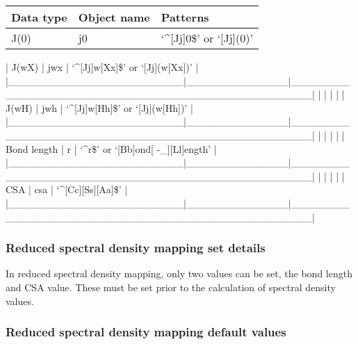 \begin{center}
\begin{tabular}{lll}
\toprule
Data type & Object name & Patterns \\
\midrule
 J(0)                    &  j0            &  `\^{}[Jj]0\$' or `[Jj](0)'                            \\
\bottomrule
\end{tabular}
\end{center}

| J(wX)                  | jwx          | `\^{}[Jj]w[Xx]\$' or `[Jj](w[Xx])'                   |
|\_\_\_\_\_\_\_\_\_\_\_\_\_\_\_\_\_\_\_\_\_\_\_\_|\_\_\_\_\_\_\_\_\_\_\_\_\_\_|\_\_\_\_\_\_\_\_\_\_\_\_\_\_\_\_\_\_\_\_\_\_\_\_\_\_\_\_\_\_\_\_\_\_\_\_\_\_\_\_\_\_\_\_\_\_\_\_\_\_|
|                        |              |                                                  |
| J(wH)                  | jwh          | `\^{}[Jj]w[Hh]\$' or `[Jj](w[Hh])'                   |
|\_\_\_\_\_\_\_\_\_\_\_\_\_\_\_\_\_\_\_\_\_\_\_\_|\_\_\_\_\_\_\_\_\_\_\_\_\_\_|\_\_\_\_\_\_\_\_\_\_\_\_\_\_\_\_\_\_\_\_\_\_\_\_\_\_\_\_\_\_\_\_\_\_\_\_\_\_\_\_\_\_\_\_\_\_\_\_\_\_|
|                        |              |                                                  |
| Bond length            | r            | `\^{}r\$' or `[Bb]ond[ -\_][Ll]ength'                 |
|\_\_\_\_\_\_\_\_\_\_\_\_\_\_\_\_\_\_\_\_\_\_\_\_|\_\_\_\_\_\_\_\_\_\_\_\_\_\_|\_\_\_\_\_\_\_\_\_\_\_\_\_\_\_\_\_\_\_\_\_\_\_\_\_\_\_\_\_\_\_\_\_\_\_\_\_\_\_\_\_\_\_\_\_\_\_\_\_\_|
|                        |              |                                                  |
| CSA                    | csa          | `\^{}[Cc][Ss][Aa]\$'                                 |
|\_\_\_\_\_\_\_\_\_\_\_\_\_\_\_\_\_\_\_\_\_\_\_\_|\_\_\_\_\_\_\_\_\_\_\_\_\_\_|\_\_\_\_\_\_\_\_\_\_\_\_\_\_\_\_\_\_\_\_\_\_\_\_\_\_\_\_\_\_\_\_\_\_\_\_\_\_\_\_\_\_\_\_\_\_\_\_\_\_|



\subsubsection{Reduced spectral density mapping set details}

In reduced spectral density mapping, only two values can be set, the bond length and CSA
value.  These must be set prior to the calculation of spectral density values.



\subsubsection{Reduced spectral density mapping default values}



